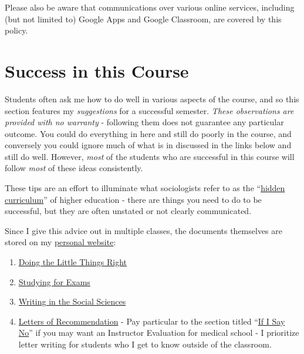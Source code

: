 \documentclass[]{book}
\providecommand{\tightlist}{%
  \setlength{\itemsep}{0pt}\setlength{\parskip}{0pt}}
\begin{document}
Please also be aware that communications over various online services, including (but not limited to) Google Apps and Google Classroom, are covered by this policy.

\hypertarget{success-in-this-course}{%
\chapter{Success in this Course}\label{success-in-this-course}}

Students often ask me how to do well in various aspects of the course, and so this section features my \emph{suggestions} for a successful semester. \emph{These observations are provided with no warranty} - following them does not guarantee any particular outcome. You could do everything in here and still do poorly in the course, and conversely you could ignore much of what is in discussed in the links below and still do well. However, \emph{most} of the students who are successful in this course will follow \emph{most} of these ideas consistently.

These tips are an effort to illuminate what sociologists refer to as the ``\href{https://books.google.com/books?hl=en\&lr=\&id=5r-TAgAAQBAJ\&oi=fnd\&pg=PP1\&dq=hidden+curriculum\#v=onepage\&q=hidden\%20curriculum\&f=false}{hidden curriculum}'' of higher education - there are things you need to do to be successful, but they are often unstated or not clearly communicated.

Since I give this advice out in multiple classes, the documents themselves are stored on my \href{https://chris-prener.github.io}{personal website}:

\begin{enumerate}
\def\labelenumi{\arabic{enumi}.}
\tightlist
\item
  \href{https://chris-prener.github.io/resources/little-things/}{Doing the Little Things Right}
\item
  \href{https://chris-prener.github.io/resources/exams/}{Studying for Exams}
\item
  \href{https://chris-prener.github.io/resources/writing/}{Writing in the Social Sciences}
\item
  \href{https://chris-prener.github.io/resources/letters/}{Letters of Recommendation} - Pay particular to the section titled ``\href{https://chris-prener.github.io/resources/letters/\#if-i-say-no}{If I Say No}'' if you may want an Instructor Evaluation for medical school - I prioritize letter writing for students who I get to know outside of the classroom.
\end{enumerate}
\end{document}
